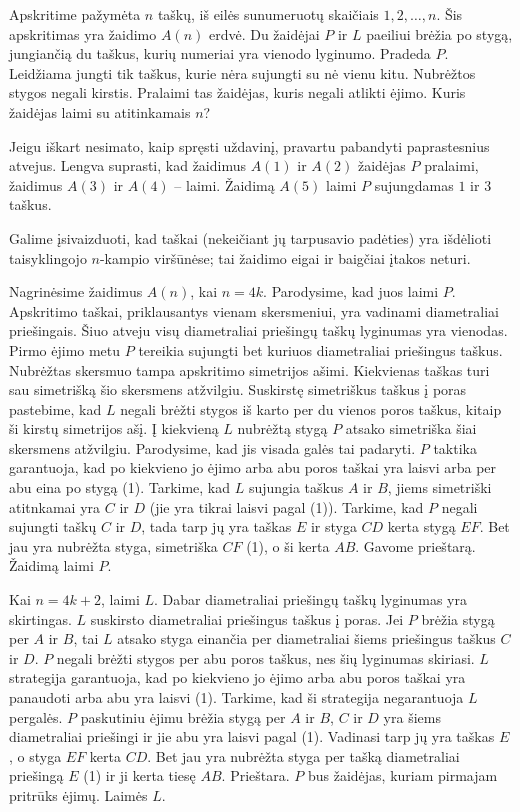 \begin{pavnr}
  Apskritime pažymėta $n$ taškų, iš eilės sunumeruotų skaičiais $1,2,\ldots,n$. Šis
  apskritimas yra žaidimo $A(n)$ erdvė. Du žaidėjai $P$ ir $L$ paeiliui brėžia po
  stygą, jungiančią du taškus, kurių numeriai yra vienodo lyginumo. Pradeda
  $P$. Leidžiama jungti tik taškus, kurie nėra sujungti su nė vienu kitu.
  Nubrėžtos stygos negali kirstis. Pralaimi tas žaidėjas, kuris negali
  atlikti ėjimo. Kuris žaidėjas laimi su atitinkamais $n$?
\end{pavnr}

\begin{sprendimas}
  Jeigu iškart nesimato, kaip spręsti uždavinį, pravartu pabandyti
  paprastesnius atvejus. Lengva suprasti, kad žaidimus $A(1)$ ir $A(2)$
  žaidėjas $P$ pralaimi, žaidimus $A(3)$ ir $A(4)$ – laimi. Žaidimą $A(5)$
  laimi $P$ sujungdamas $1$ ir $3$ taškus. 

  Galime įsivaizduoti, kad taškai (nekeičiant jų tarpusavio padėties) yra
  išdėlioti taisyklingojo $n$-kampio viršūnėse; tai žaidimo eigai ir baigčiai
  įtakos neturi.

  Nagrinėsime žaidimus $A(n)$, kai $n=4k$. Parodysime, kad juos laimi $P$.
  Apskritimo taškai, priklausantys vienam skersmeniui, yra vadinami
  diametraliai priešingais. Šiuo atveju visų diametraliai priešingų taškų
  lyginumas yra vienodas. Pirmo ėjimo metu $P$ tereikia sujungti bet kuriuos
  diametraliai priešingus taškus. Nubrėžtas skersmuo tampa apskritimo
  simetrijos ašimi. Kiekvienas taškas turi sau simetrišką šio skersmens
  atžvilgiu. Suskirstę simetriškus taškus į poras pastebime, kad $L$ negali
  brėžti stygos iš karto per du vienos poros taškus, kitaip ši kirstų
  simetrijos ašį. Į kiekvieną $L$ nubrėžtą stygą $P$ atsako simetriška šiai
  skersmens atžvilgiu. Parodysime, kad jis visada galės tai padaryti. $P$
  taktika garantuoja, kad po kiekvieno jo ėjimo arba abu poros taškai yra
  laisvi arba per abu eina po stygą (1). Tarkime, kad $L$ sujungia taškus $A$
  ir $B$, jiems simetriški atitnkamai yra $C$ ir $D$ (jie yra tikrai laisvi
  pagal (1)).  Tarkime, kad $P$ negali sujungti taškų $C$ ir $D$, tada tarp
  jų yra taškas $E$ ir styga $CD$ kerta stygą $EF$. Bet jau yra nubrėžta
  styga, simetriška $CF$ (1), o ši kerta $AB$. Gavome prieštarą. Žaidimą
  laimi $P$. 

  Kai $n=4k+2$, laimi $L$. Dabar diametraliai priešingų taškų lyginumas yra
  skirtingas. $L$ suskirsto diametraliai priešingus taškus į poras. Jei $P$
  brėžia stygą per $A$ ir $B$, tai $L$ atsako styga einančia per diametraliai šiems
  priešingus taškus $C$ ir $D$. $P$ negali brėžti stygos per abu poros taškus, nes šių
  lyginumas skiriasi. $L$ strategija garantuoja, kad po kiekvieno jo ėjimo arba
  abu poros taškai yra panaudoti arba abu yra laisvi (1). Tarkime, kad ši
  strategija negarantuoja $L$ pergalės. $P$ paskutiniu ėjimu brėžia stygą per
  $A$ ir $B$, $C$ ir $D$ yra šiems diametraliai priešingi ir jie abu
  yra laisvi pagal (1). Vadinasi tarp jų yra taškas $E$, o styga $EF$ kerta $CD$.
  Bet jau yra nubrėžta styga per tašką diametraliai priešingą $E$ (1) ir ji
  kerta tiesę $AB$. Prieštara. $P$ bus žaidėjas, kuriam pirmajam pritrūks ėjimų.
  Laimės $L$.


\end{sprendimas}
